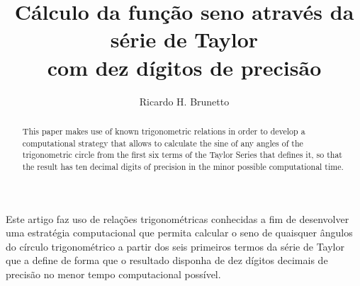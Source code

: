 

\sloppy

\title{Cálculo da função seno através da série de Taylor\\com dez dígitos de precisão}

\author{Ricardo H. Brunetto}


\address{Departamento de Informática -- Universidade Estadual de Maringá (UEM)\\
	Maringá -- PR -- Brasil
}



	\maketitle

	\begin{abstract}
		This paper makes use of known trigonometric relations in order to develop a
		computational strategy that allows to calculate the sine of any angles of the
		trigonometric circle from the first six terms of the Taylor Series that defines it,
		so that	the result has ten decimal digits of precision in the minor possible computational
		time.
	\end{abstract}

	\begin{resumo}
		Este artigo faz uso de relações trigonométricas conhecidas a fim de desenvolver
		uma estratégia computacional que permita calcular o seno de quaisquer ângulos do
		círculo trigonométrico a partir dos seis primeiros termos da série de Taylor que
		a define de forma que o resultado disponha de dez dígitos decimais de precisão no
		menor tempo	computacional possível.
	\end{resumo}


